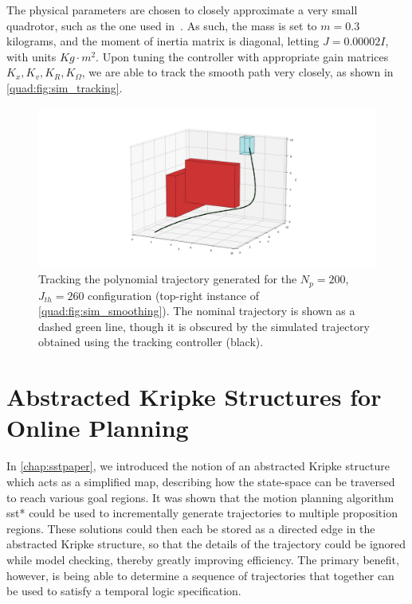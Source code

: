 The physical parameters are chosen to closely approximate a very small quadrotor, such as the one used in~\cite{Luis2016}. As such, the mass is set to $m=0.3$ kilograms, and the moment of inertia matrix is diagonal, letting $J=0.00002 I$, with units $Kg\cdot m^2$. Upon tuning the controller with appropriate gain matrices $K_x, K_v, K_R, K_\Omega$, we are able to track the smooth path very closely, as shown in \autoref{quad:fig:sim_tracking}. 

\begin{figure}
    \centering
    \hspace*{-4cm}
    \includegraphics[scale=0.5]{./figures/sim_tracking}
    \caption[Quadrotor simulation trajectory tracking]{Tracking the polynomial trajectory generated for the $N_p = 200$, $J_{th}=260$ configuration (top-right instance of \autoref{quad:fig:sim_smoothing}). The nominal trajectory is shown as a dashed green line, though it is obscured by the simulated trajectory obtained using the tracking controller (black).}
\label{quad:fig:sim_tracking}
\end{figure}



\section{Abstracted Kripke Structures for Online Planning}

In \autoref{chap:sstpaper}, we introduced the notion of an abstracted Kripke structure which acts as a simplified map, describing how the state-space can be traversed to reach various goal regions. It was shown that the motion planning algorithm \gls{sst}* could be used to incrementally generate trajectories to multiple proposition regions. These solutions could then each be stored as a directed edge in the abstracted Kripke structure, so that the details of the trajectory could be ignored while model checking, thereby greatly improving efficiency. The primary benefit, however, is being able to determine a sequence of trajectories that together can be used to satisfy a temporal logic specification. 

